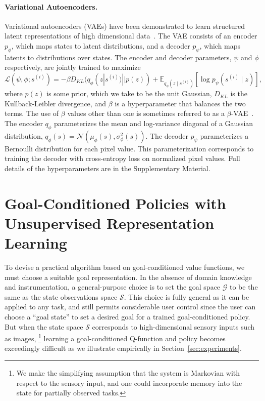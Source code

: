 \vspace{-0.1in}
\paragraph{Variational Autoencoders.}
Variational autoencoders (VAEs) have been demonstrated to learn structured latent representations of high dimensional data~\citep{kingma2014vae}.
The VAE consists of an encoder $p_\phi$, which maps states to latent distributions,
and a decoder $p_\psi$, which maps latents to distributions over states.
The encoder and decoder parameters, $\psi$ and $\phi$ respectively, are jointly trained to maximize
\begin{equation}\label{eq:vae-loss}
    \mathcal L (\psi, \phi; s^{(i)}) = - \beta D_{KL}(q_\phi(z | s^{(i)}) || p(z)) + \mathbb E_{q_\phi(z \mid s^{(i)})} [ \log p_\psi(s^{(i)} \mid z) ],
\end{equation}
where $p(z)$ is some prior, which we take to be the unit Gaussian, $D_{KL}$ is the Kullback-Leibler divergence, and $\beta$ is a hyperparameter that balances the two terms.
The use of $\beta$ values other than one is sometimes referred to as a $\beta$-VAE~\citep{higgins2016beta}.
The encoder $q_\phi$ parameterizes the mean and log-variance diagonal of a Gaussian distribution, $q_\phi(s) = \mathcal N(\mu_\phi(s), \sigma^2_\phi(s))$.
The decoder $p_\psi$ parameterizes a Bernoulli distribution for each pixel value.
This parameterization corresponds to training the decoder with cross-entropy loss on normalized pixel values.
Full details of the hyperparameters are in the Supplementary Material.

\section{Goal-Conditioned Policies with Unsupervised Representation Learning}
To devise a practical algorithm based on goal-conditioned value functions, we must choose a suitable goal representation.
In the absence of domain knowledge and instrumentation, a general-purpose choice is to set the goal space $\mathcal G$ to be the same as the state observations space $\mathcal S$.
This choice is fully general as it can be applied to any task, and still permits considerable user control since the user can choose a ``goal state'' to set a desired goal for a trained goal-conditioned policy.
But when the state space $\mathcal S$ corresponds to high-dimensional sensory inputs
such as images,
\setcounter{footnote}{0}
\footnote{We make the simplifying assumption that the system is Markovian with respect to the sensory input, and one could incorporate memory into the state for partially observed tasks.}
learning a goal-conditioned Q-function and policy becomes exceedingly difficult as we illustrate empirically in Section~\ref{sec:experiments}.

